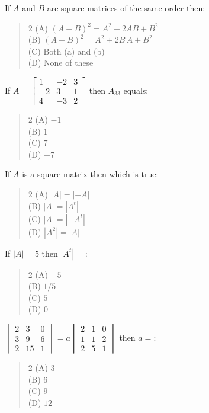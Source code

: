 \documentclass[11pt,a4paper]{article}
\begin{document}
\begin{mcqlist}
\item If $A$ and $B$ are square matrices of the same order then:
\begin{quote}\begin{multicols}{2}
\noindent (A) $(A+B)^2=A^2+2AB+B^2$ \\
(B) $(A+B)^2=A^2+2B\,A+B^2$ \\
(C) Both (a) and (b) \\
(D) None of these
\end{multicols}\end{quote}

\item If $A=\begin{bmatrix}1&-2&3\\-2&3&1\\4&-3&2\end{bmatrix}$ then $A_{33}$ equals:
\begin{quote}\begin{multicols}{2}
\noindent (A) $-1$ \\
(B) $1$ \\
(C) $7$ \\
(D) $-7$
\end{multicols}\end{quote}

\item If $A$ is a square matrix then which is true:
\begin{quote}\begin{multicols}{2}
\noindent (A) $|A|=|-A|$ \\
(B) $|A|=|A^t|$ \\
(C) $|A|=|-A^t|$ \\
(D) $|A^2|=|A|$
\end{multicols}\end{quote}

\item If $|A|=5$ then $|A^t|=$:
\begin{quote}\begin{multicols}{2}
\noindent (A) $-5$ \\
(B) $1/5$ \\
(C) $5$ \\
(D) $0$
\end{multicols}\end{quote}

\item $\begin{vmatrix}2&3&0\\3&9&6\\2&15&1\end{vmatrix}=a\begin{vmatrix}2&1&0\\1&1&2\\2&5&1\end{vmatrix}$ then $a=$:
\begin{quote}\begin{multicols}{2}
\noindent (A) $3$ \\
(B) $6$ \\
(C) $9$ \\
(D) $12$
\end{multicols}\end{quote}


\end{mcqlist}
\end{document}
